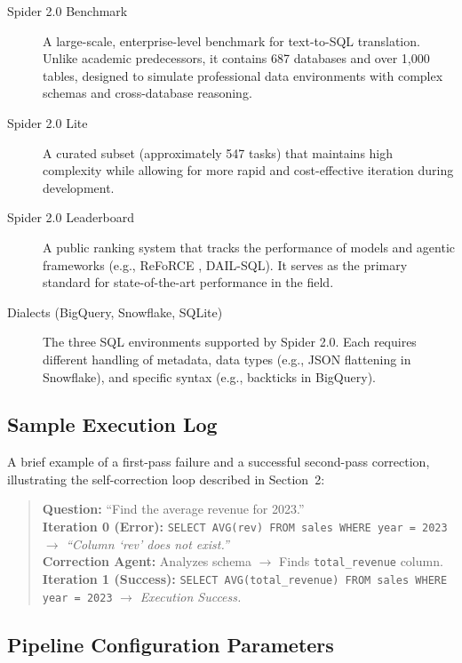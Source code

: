 \begin{description}
    \item[Spider 2.0 Benchmark] A large-scale, enterprise-level benchmark for 
    text-to-SQL translation. Unlike academic predecessors, it contains 687 databases 
    and over 1{,}000 tables, designed to simulate professional data environments with 
    complex schemas and cross-database reasoning.
    \item[Spider 2.0 Lite] A curated subset (approximately 547 tasks) that maintains 
    high complexity while allowing for more rapid and cost-effective iteration during 
    development.
    \item[Spider 2.0 Leaderboard] A public ranking system that tracks the performance 
    of models and agentic frameworks (e.g., ReFoRCE \cite{deng2025reforce}, DAIL-SQL). It serves as the 
    primary standard for state-of-the-art performance in the field.
    \item[Dialects (BigQuery, Snowflake, SQLite)] The three SQL environments supported 
    by Spider 2.0. Each requires different handling of metadata, data types (e.g., JSON 
    flattening in Snowflake), and specific syntax (e.g., backticks in BigQuery).
\end{description}

\subsection{Sample Execution Log}

A brief example of a first-pass failure and a successful second-pass correction, 
illustrating the self-correction loop described in Section~2:

\begin{quote}
\textbf{Question:} ``Find the average revenue for 2023.'' \\[0.5em]
\textbf{Iteration 0 (Error):} \texttt{SELECT AVG(rev) FROM sales WHERE year = 2023} 
$\rightarrow$ \textit{``Column `rev' does not exist.''} \\[0.3em]
\textbf{Correction Agent:} Analyzes schema $\rightarrow$ Finds 
\texttt{total\_revenue} column. \\[0.3em]
\textbf{Iteration 1 (Success):} \texttt{SELECT AVG(total\_revenue) FROM sales 
WHERE year = 2023} $\rightarrow$ \textit{Execution Success.}
\end{quote}

\subsection{Pipeline Configuration Parameters}

